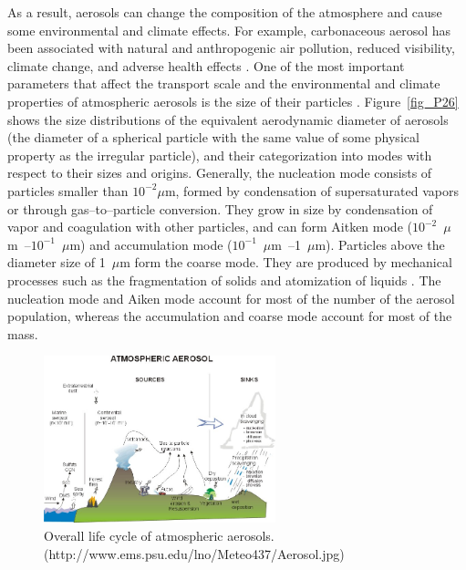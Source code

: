 \documentclass[12pt, fullpage]{uiucthesis2009}
\begin{document}
	As a result, aerosols can change the composition of the atmosphere and cause some environmental and climate effects. For example, carbonaceous aerosol has been associated with natural and anthropogenic air pollution, reduced visibility, climate change, and adverse health effects \citep{Mauderly2008}. One of the most important parameters that affect the transport scale and the environmental and climate properties of atmospheric aerosols is the size of their particles \citep{Pacyna1995}. Figure~\ref{fig_P26} shows the size distributions of the equivalent aerodynamic diameter of aerosols (the diameter of a spherical particle with the same value of some physical property as the irregular particle), and their categorization into modes with respect to their sizes and origins. Generally, the nucleation mode consists of particles smaller than $10^{-2}\mu$m, formed by condensation of supersaturated vapors or through gas--to--particle conversion. They grow in size by condensation of vapor and coagulation with other particles, and can form Aitken mode ($10^{-2}$~$\mu$m~--$10^{-1}$~$\mu$m) and accumulation mode ($10^{-1}$~$\mu$m~--1~$\mu$m). Particles above the diameter size of 1~$\mu$m form the coarse mode. They are produced by mechanical processes such as the fragmentation of solids and atomization of liquids \citep{Pacyna1995,kulmala2004}.
	The nucleation mode and Aiken mode account for most of the number of the aerosol population, whereas the accumulation and coarse mode account for most of the mass. 
	
	\begin{figure}[h] 
		\begin{center}
			\includegraphics[width = 0.6\textwidth]{Figure25}
			\caption[Overall life cycle of atmospheric aerosols]{\label{fig_P25} Overall life cycle of atmospheric aerosols. (http://www.ems.psu.edu/lno/Meteo437/Aerosol.jpg)}
		\end{center}
	\end{figure}
	
\end{document}
